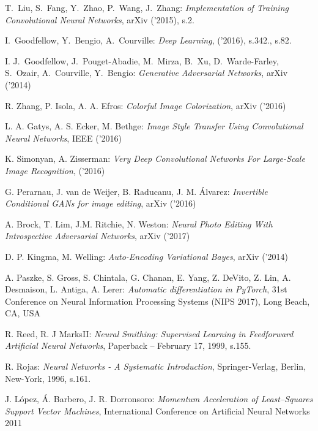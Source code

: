 \begin{thebibliography}{99} %

   T.~Liu, S.~Fang, Y.~Zhao, P.~Wang, J.~Zhang:
  \emph{Implementation of Training Convolutional Neural Networks}, arXiv ('2015), s.2.

   I.~Goodfellow, Y.~Bengio, A.~Courville:
  \emph{Deep Learning}, ('2016), s.342., s.82.

   I. J.~Goodfellow, J.~Pouget-Abadie, M.~Mirza, B.~Xu, D.~Warde-Farley, S.~Ozair, A.~Courville, Y.~Bengio:
  \emph{Generative Adversarial Networks}, arXiv ('2014)

   R. Zhang, P. Isola, A. A. Efros:
  \emph{Colorful Image Colorization}, arXiv ('2016)

   L. A. Gatys, A. S. Ecker, M. Bethge:
  \emph{Image Style Transfer Using Convolutional Neural Networks}, IEEE ('2016)

   K. Simonyan, A. Zisserman:
  \emph{Very Deep Convolutional Networks For Large-Scale Image Recognition}, ('2016)

   G. Perarnau, J. van de Weijer, B. Raducanu, J. M. Álvarez:
  \emph{Invertible Conditional GANs for image editing}, arXiv ('2016)

   A. Brock, T. Lim, J.M. Ritchie,
  N. Weston:
  \emph{Neural Photo Editing With Introspective Adversarial Networks}, arXiv ('2017)

   D. P. Kingma, M. Welling:
  \emph{Auto-Encoding Variational Bayes}, arXiv ('2014)

   A. Paszke, S. Gross, S. Chintala, G. Chanan,
  E. Yang, Z. DeVito, Z. Lin, A. Desmaison, L. Antiga, A. Lerer:
  \emph{Automatic differentiation in PyTorch}, 31st Conference on Neural Information
  Processing Systems (NIPS 2017), Long Beach, CA, USA

    R. Reed,  R. J MarksII:
  \emph{Neural Smithing: Supervised Learning in Feedforward Artificial Neural Networks},
  Paperback – February 17, 1999, s.155.

   R. Rojas:
  \emph{Neural Networks - A Systematic Introduction},
  Springer-Verlag, Berlin, New-York, 1996, s.161.

   J. López, Á. Barbero, J. R. Dorronsoro:
  \emph{Momentum Acceleration of Least–Squares Support Vector Machines},
  International Conference on Artificial Neural Networks 2011


\end{thebibliography}
